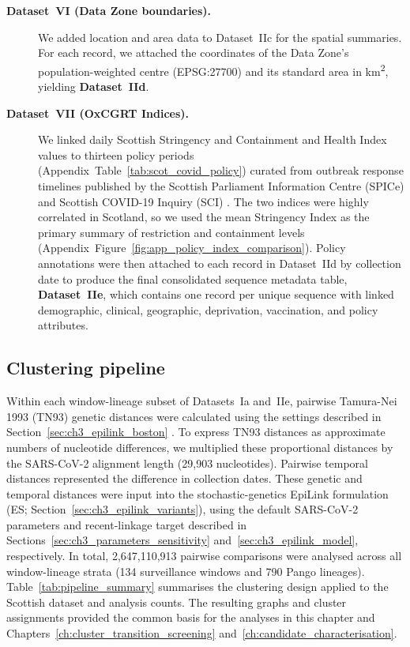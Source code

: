 \begin{description}
	\item[\textbf{Dataset~VI (Data Zone boundaries).}] We added location and area data to Dataset~IIc for the spatial summaries. For each record, we attached the coordinates of the Data Zone's population-weighted centre (EPSG:27700) and its standard area in km\textsuperscript{2}, yielding \textbf{Dataset~IId}.

	\item[\textbf{Dataset~VII (OxCGRT Indices).}] We linked daily Scottish Stringency and Containment and Health Index values \citep{Hale2021} to thirteen policy periods (Appendix~Table~\ref{tab:scot_covid_policy}) curated from outbreak response timelines published by the Scottish Parliament Information Centre (SPICe) \citep{ScottishParliamentSPICe2023} and Scottish COVID-19 Inquiry (SCI) \citep{ScottishCovidInquiryTimeline}. The two indices were highly correlated in Scotland, so we used the mean Stringency Index as the primary summary of restriction and containment levels (Appendix~Figure~\ref{fig:app_policy_index_comparison}). Policy annotations were then attached to each record in Dataset~IId by collection date to produce the final consolidated sequence metadata table, \textbf{Dataset~IIe}, which contains one record per unique sequence with linked demographic, clinical, geographic, deprivation, vaccination, and policy attributes.
\end{description}

\subsection{Clustering pipeline}\label{sec:ch4_pipeline}

Within each window-lineage subset of Datasets~Ia and~IIe, pairwise Tamura-Nei 1993 (TN93) genetic distances were calculated using the settings described in Section~\ref{sec:ch3_epilink_boston} \citep{TamuraNei1993,KosakovskyPond2018}. To express TN93 distances as approximate numbers of nucleotide differences, we multiplied these proportional distances by the SARS-CoV-2 alignment length (29,903 nucleotides). Pairwise temporal distances represented the difference in collection dates. These genetic and temporal distances were input into the stochastic-genetics EpiLink formulation (ES; Section~\ref{sec:ch3_epilink_variants}), using the default SARS-CoV-2 parameters and recent-linkage target described in Sections~\ref{sec:ch3_parameters_sensitivity} and~\ref{sec:ch3_epilink_model}, respectively. In total, 2,647,110,913 pairwise comparisons were analysed across all window-lineage strata (134 surveillance windows and 790 Pango lineages). Table~\ref{tab:pipeline_summary} summarises the clustering design applied to the Scottish dataset and analysis counts. The resulting graphs and cluster assignments provided the common basis for the analyses in this chapter and Chapters~\ref{ch:cluster_transition_screening} and~\ref{ch:candidate_characterisation}.

